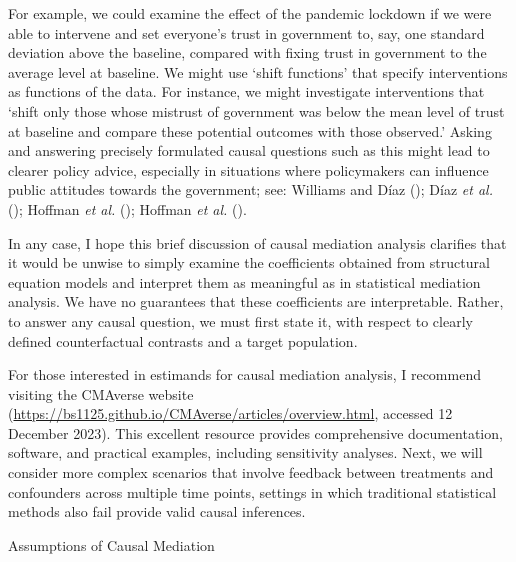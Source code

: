 \documentclass[
  single column]{article}
\begin{document}
For example, we could examine the effect of the pandemic lockdown if we
were able to intervene and set everyone's trust in government to, say,
one standard deviation above the baseline, compared with fixing trust in
government to the average level at baseline. We might use `shift
functions' that specify interventions as functions of the data. For
instance, we might investigate interventions that `shift only those
whose mistrust of government was below the mean level of trust at
baseline and compare these potential outcomes with those observed.'
Asking and answering precisely formulated causal questions such as this
might lead to clearer policy advice, especially in situations where
policymakers can influence public attitudes towards the government; see:
Williams and Díaz (); Díaz \emph{et
al.} (); Hoffman \emph{et al.}
(); Hoffman \emph{et al.}
().

In any case, I hope this brief discussion of causal mediation analysis
clarifies that it would be unwise to simply examine the coefficients
obtained from structural equation models and interpret them as
meaningful as in statistical mediation analysis. We have no guarantees
that these coefficients are interpretable. Rather, to answer any causal
question, we must first state it, with respect to clearly defined
counterfactual contrasts and a target population.

For those interested in estimands for causal mediation analysis, I
recommend visiting the CMAverse website
(\url{https://bs1125.github.io/CMAverse/articles/overview.html},
accessed 12 December 2023). This excellent resource provides
comprehensive documentation, software, and practical examples, including
sensitivity analyses. Next, we will consider more complex scenarios that
involve feedback between treatments and confounders across multiple time
points, settings in which traditional statistical methods also fail
provide valid causal inferences.

\newpage{}

\begin{table}

\caption{\label{tbl-medationassumptions}Assumptions of Causal Mediation}

\centering{

\mediationassumptionsswig

}

\end{table}%
\end{document}
